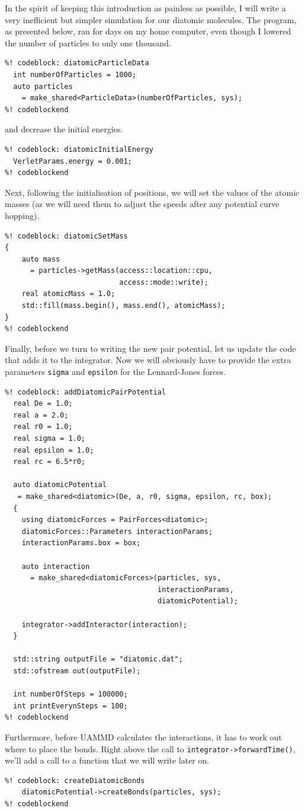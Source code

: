In the spirit of keeping this introduction as painless as possible, I will write 
a very inefficient but simpler simulation for our diatomic molecules. The 
program, as presented below, ran for days on my home computer, even though I 
lowered the number of particles to only one thousand.
\begin{lstlisting}
%! codeblock: diatomicParticleData
  int numberOfParticles = 1000;
  auto particles
    = make_shared<ParticleData>(numberOfParticles, sys);
%! codeblockend
\end{lstlisting}
and decrease the initial energies.
\begin{lstlisting}
%! codeblock: diatomicInitialEnergy
  VerletParams.energy = 0.001;
%! codeblockend
\end{lstlisting}
Next, following the initialisation of positions, we will set the values of the 
atomic masses (as we will need them to adjust the speeds after any potential 
curve hopping).
\begin{lstlisting}
%! codeblock: diatomicSetMass
{
    auto mass
      = particles->getMass(access::location::cpu,
                           access::mode::write);
    real atomicMass = 1.0;
    std::fill(mass.begin(), mass.end(), atomicMass);
}
%! codeblockend
\end{lstlisting}
Finally, before we turn to writing the new pair potential, let us update the 
code that adds it to the integrator. Now we will obviously have to provide the 
extra parameters \texttt{sigma} and \texttt{epsilon} for the Lennard-Jones 
forces.
\begin{lstlisting}
%! codeblock: addDiatomicPairPotential
  real De = 1.0;
  real a = 2.0;
  real r0 = 1.0;
  real sigma = 1.0;
  real epsilon = 1.0;
  real rc = 6.5*r0;

  auto diatomicPotential
   = make_shared<diatomic>(De, a, r0, sigma, epsilon, rc, box);
  {
    using diatomicForces = PairForces<diatomic>;
    diatomicForces::Parameters interactionParams;
    interactionParams.box = box;

    auto interaction
      = make_shared<diatomicForces>(particles, sys,
                                    interactionParams,
                                    diatomicPotential);

    integrator->addInteractor(interaction);
  }

  std::string outputFile = "diatomic.dat";
  std::ofstream out(outputFile);

  int numberOfSteps = 100000;
  int printEverynSteps = 100;
%! codeblockend
\end{lstlisting}
Furthermore, before UAMMD calculates the interactions, it has to work out where 
to place the bonds. Right above the call to \texttt{integrator->forwardTime()}, 
we'll add a call to a function that we will write later on.
\begin{lstlisting}
%! codeblock: createDiatomicBonds
    diatomicPotential->createBonds(particles, sys);
%! codeblockend
\end{lstlisting}

